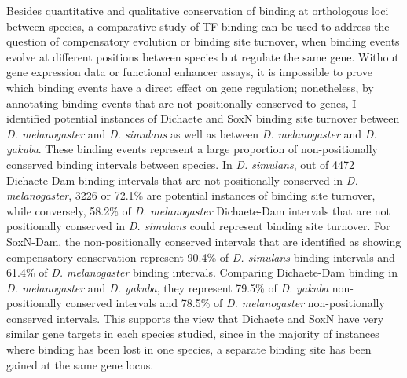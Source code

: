 Besides quantitative and qualitative conservation of binding at orthologous loci between species, a comparative study of TF binding can be used to address the question of compensatory evolution or binding site turnover, when binding events evolve at different positions between species but regulate the same gene. Without gene expression data or functional enhancer assays, it is impossible to prove which binding events have a direct effect on gene regulation; nonetheless, by annotating binding events that are not positionally conserved to genes, I identified potential instances of Dichaete and SoxN binding site turnover between \emph{D. melanogaster} and \emph{D. simulans} as well as between \emph{D. melanogaster} and \emph{D. yakuba}. These binding events represent a large proportion of non-positionally conserved binding intervals between species. In \emph{D. simulans}, out of 4472 Dichaete-Dam binding intervals that are not positionally conserved in \emph{D. melanogaster}, 3226 or 72.1\% are potential instances of binding site turnover, while conversely, 58.2\% of \emph{D. melanogaster} Dichaete-Dam intervals that are not positionally conserved in \emph{D. simulans} could represent binding site turnover. For SoxN-Dam, the non-positionally conserved intervals that are identified as showing compensatory conservation represent 90.4\% of \emph{D. simulans} binding intervals and 61.4\% of \emph{D. melanogaster} binding intervals. Comparing Dichaete-Dam binding in \emph{D. melanogaster} and \emph{D. yakuba}, they represent 79.5\% of \emph{D. yakuba} non-positionally conserved intervals and 78.5\% of \emph{D. melanogaster} non-positionally conserved intervals. This supports the view that Dichaete and SoxN have very similar gene targets in each species studied, since in the majority of instances where binding has been lost in one species, a separate binding site has been gained at the same gene locus.

